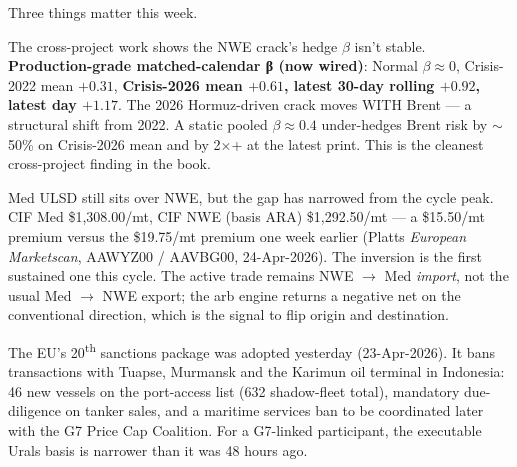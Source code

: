 \documentclass[10pt,a4paper]{article}
\begin{document}
\noindent\begin{minipage}[t]{0.55\linewidth}
\vspace{0pt}

Three things matter this week.

The cross-project work shows the NWE crack's hedge $\beta$ isn't stable. \textbf{Production-grade matched-calendar β (now wired)}: Normal $\beta \approx 0$, Crisis-2022 mean $+0.31$, \textbf{Crisis-2026 mean $+0.61$, latest 30-day rolling $+0.92$, latest day $+1.17$}. The 2026 Hormuz-driven crack moves WITH Brent — a structural shift from 2022. A static pooled $\beta \approx 0.4$ under-hedges Brent risk by $\sim$50\% on Crisis-2026 mean and by 2$\times$+ at the latest print. This is the cleanest cross-project finding in the book.

Med ULSD still sits over \mbox{NWE}, but the gap has narrowed from the cycle peak. CIF Med \$1,308.00/mt, CIF \mbox{NWE} (basis ARA) \$1,292.50/mt --- a \$15.50/mt premium versus the \$19.75/mt premium one week earlier (Platts \emph{European Marketscan}, AAWYZ00 / AAVBG00, 24-Apr-2026). The inversion is the first sustained one this cycle. The active trade remains \mbox{NWE} $\rightarrow$ Med \emph{import}, not the usual Med $\rightarrow$ \mbox{NWE} export; the arb engine returns a negative net on the conventional direction, which is the signal to flip origin and destination.

The EU's 20\textsuperscript{th} sanctions package was adopted yesterday (23-Apr-2026). It bans transactions with Tuapse, Murmansk and the Karimun oil terminal in Indonesia: 46 new vessels on the port-access list (632 shadow-fleet total), mandatory due-diligence on tanker sales, and a maritime services ban to be coordinated later with the G7 Price Cap Coalition. For a G7-linked participant, the executable Urals basis is narrower than it was 48 hours ago.

\end{minipage}\hfill
\end{document}
